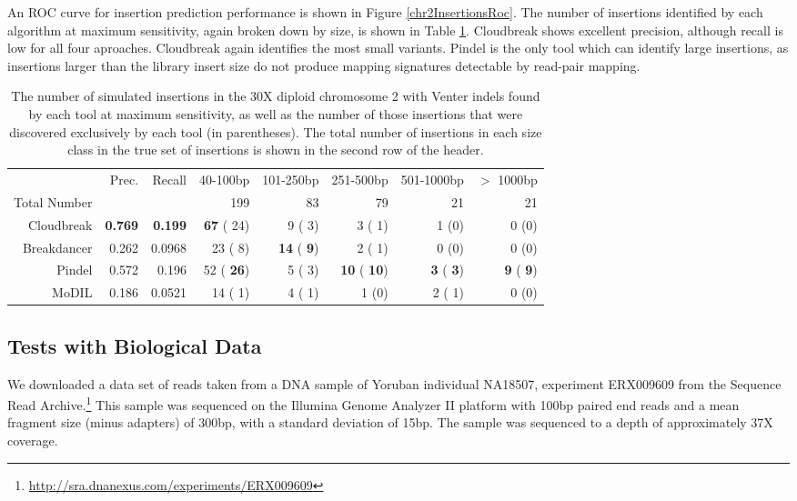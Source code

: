 \documentclass[11pt]{article}
\begin{document}
An ROC curve for insertion prediction performance is shown in Figure \ref{chr2InsertionsRoc}. The number of insertions identified by each algorithm at maximum sensitivity, again broken down by size, is shown in Table \ref{chr2InsertionPreds}. Cloudbreak shows excellent precision, although recall is low for all four aproaches. Cloudbreak again identifies the most small variants. Pindel is the only tool which can identify large insertions, as insertions larger than the library insert size do not produce mapping signatures detectable by read-pair mapping.

\begin{table}[t]
\begin{center}
\begin{tabular}{rrr|rrrrr}
  \hline
                        & Prec. & Recall & 40-100bp  & 101-250bp  & 251-500bp & 501-1000bp & $>$ 1000bp \\ 
 Total Number &          &           & 199 &  83 & 79 &  21 & 21\\ 
  \hline
  Cloudbreak   &\textbf{0.769} & \textbf{0.199}  & \textbf{  67} (  24)  &    9 (   3) &     3 (   1) &    1 (0) & 0 (0) \\ 
  Breakdancer & 0.262 & 0.0968  &   23 (   8)  & \textbf{  14} (\textbf{   9}) &     2 (   1) & 0 (0) & 0 (0) \\ 
  Pindel          & 0.572 & 0.196 &   52 (\textbf{  26})  &    5 (   3) &  \textbf{  10} (\textbf{  10}) & \textbf{   3} (\textbf{   3}) & \textbf{   9} (\textbf{   9})\\ 
  MoDIL          & 0.186 & 0.0521 &   14 (   1)  &    4 (   1) &     1 (0) &    2 (   1) & 0 (0)\\ 
   \hline
\end{tabular}
\end{center}
\caption{The number of simulated insertions in the 30X diploid chromosome 2 with Venter indels found by each tool at maximum sensitivity, as well as the number of those insertions that were discovered exclusively by each tool (in parentheses). The total number of insertions in each size class in the true set of insertions is shown in the second row of the header.}
\label{chr2InsertionPreds}
\end{table}

\subsection{Tests with Biological Data}

We downloaded a data set of reads taken from a DNA sample of Yoruban individual NA18507, experiment ERX009609 from the Sequence Read Archive.\footnote{\url{http://sra.dnanexus.com/experiments/ERX009609}} This sample was sequenced on the Illumina Genome Analyzer II platform with 100bp paired end reads and a mean fragment size (minus adapters) of 300bp, with a standard deviation of 15bp. The sample was sequenced to a depth of approximately 37X coverage.
\end{document}
